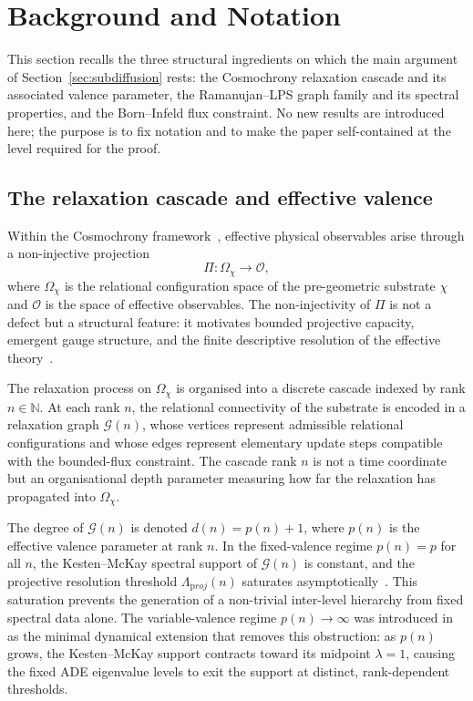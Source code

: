 \documentclass[11pt,a4paper]{article}
\theoremstyle{definition}
\theoremstyle{remark}
\begin{document}
  \section{Background and Notation}
  \label{sec:background}

  This section recalls the three structural ingredients on which the main argument of
  Section~\ref{sec:subdiffusion} rests: the Cosmochrony relaxation cascade and its
  associated valence parameter, the Ramanujan--LPS graph family and its spectral properties,
  and the Born--Infeld flux constraint.
  No new results are introduced here; the purpose is to fix notation and to make the paper
  self-contained at the level required for the proof.

  \subsection{The relaxation cascade and effective valence}
    \label{ssec:cascade}

    Within the Cosmochrony framework~\cite{Cosmochrony}, effective physical observables
    arise through a non-injective projection
    \begin{equation}
      \Pi : \Omega_\chi \to \mathcal{O},
    \end{equation}
    where $\Omega_\chi$ is the relational configuration space of the pre-geometric substrate
    $\chi$ and $\mathcal{O}$ is the space of effective observables.
    The non-injectivity of $\Pi$ is not a defect but a structural feature: it motivates
    bounded projective capacity, emergent gauge structure, and the finite descriptive
    resolution of the effective theory~\cite{Beau2026c}.

    The relaxation process on $\Omega_\chi$ is organised into a discrete cascade indexed by
    rank $n \in \mathbb{N}$.
    At each rank $n$, the relational connectivity of the substrate is encoded in a relaxation
    graph $\mathcal{G}(n)$, whose vertices represent admissible relational configurations and
    whose edges represent elementary update steps compatible with the bounded-flux constraint.
    The cascade rank $n$ is not a time coordinate but an organisational depth parameter
    measuring how far the relaxation has propagated into $\Omega_\chi$.

    The degree of $\mathcal{G}(n)$ is denoted $d(n) = p(n) + 1$, where $p(n)$ is the
    effective valence parameter at rank $n$.
    In the fixed-valence regime $p(n) = p$ for all $n$, the Kesten--McKay spectral support
    of $\mathcal{G}(n)$ is constant, and the projective resolution threshold $\Lambda_{\mathrm proj}(n)$
    saturates asymptotically~\cite{Beau2026a5}.
    This saturation prevents the generation of a non-trivial inter-level hierarchy from fixed
    spectral data alone.
    The variable-valence regime $p(n) \to \infty$ was introduced in~\cite{Beau2026a6} as the
    minimal dynamical extension that removes this obstruction: as $p(n)$ grows, the
    Kesten--McKay support contracts toward its midpoint $\lambda = 1$, causing the fixed ADE
    eigenvalue levels to exit the support at distinct, rank-dependent thresholds.
\end{document}
